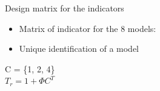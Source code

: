 \documentclass[a4paper,9pt]{beamer}
\begin{document}
\begin{frame}{\huge{Design matrix for the indicators}}
\medium
\begin{itemize}
\item Matrix of indicator for  the 8 models:
\end{itemize}
\vspace{0.5cm}
\begin{itemize}
\item Unique identification of a model
\end{itemize}
C = \{1, 2, 4\} \\ 
$T_r = 1 + \Phi C^T$
\end{frame}
\end{document}

